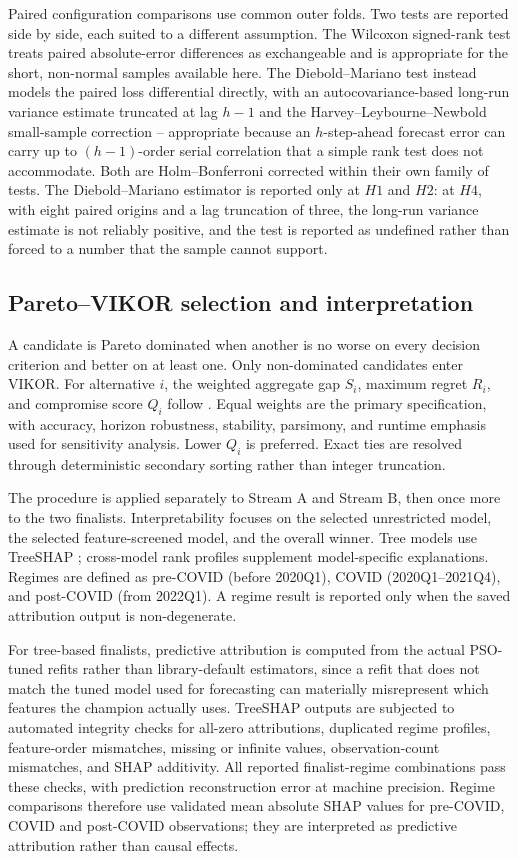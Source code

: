 \documentclass[preprint,12pt]{elsarticle}
\begin{document}
Paired configuration comparisons use common outer folds. Two tests are reported side by side, each suited to a different assumption. The Wilcoxon signed-rank test treats paired absolute-error differences as exchangeable and is appropriate for the short, non-normal samples available here. The Diebold--Mariano test \citep{dieboldmariano1995} instead models the paired loss differential directly, with an autocovariance-based long-run variance estimate truncated at lag $h-1$ and the Harvey--Leybourne--Newbold small-sample correction -- appropriate because an $h$-step-ahead forecast error can carry up to $(h-1)$-order serial correlation that a simple rank test does not accommodate. Both are Holm--Bonferroni corrected within their own family of tests. The Diebold--Mariano estimator is reported only at $H1$ and $H2$: at $H4$, with eight paired origins and a lag truncation of three, the long-run variance estimate is not reliably positive, and the test is reported as undefined rather than forced to a number that the sample cannot support.

\subsection{Pareto--VIKOR selection and interpretation}

A candidate is Pareto dominated when another is no worse on every decision criterion and better on at least one. Only non-dominated candidates enter VIKOR. For alternative $i$, the weighted aggregate gap $S_i$, maximum regret $R_i$, and compromise score $Q_i$ follow \citet{opricovic2004,opricovic2007}. Equal weights are the primary specification, with accuracy, horizon robustness, stability, parsimony, and runtime emphasis used for sensitivity analysis. Lower $Q_i$ is preferred. Exact ties are resolved through deterministic secondary sorting rather than integer truncation.

The procedure is applied separately to Stream A and Stream B, then once more to the two finalists. Interpretability focuses on the selected unrestricted model, the selected feature-screened model, and the overall winner. Tree models use TreeSHAP \citep{lundberg2017}; cross-model rank profiles supplement model-specific explanations. Regimes are defined as pre-COVID (before 2020Q1), COVID (2020Q1--2021Q4), and post-COVID (from 2022Q1). A regime result is reported only when the saved attribution output is non-degenerate.

For tree-based finalists, predictive attribution is computed from the actual PSO-tuned refits rather than library-default estimators, since a refit that does not match the tuned model used for forecasting can materially misrepresent which features the champion actually uses. TreeSHAP outputs are subjected to automated integrity checks for all-zero attributions, duplicated regime profiles, feature-order mismatches, missing or infinite values, observation-count mismatches, and SHAP additivity. All reported finalist-regime combinations pass these checks, with prediction reconstruction error at machine precision. Regime comparisons therefore use validated mean absolute SHAP values for pre-COVID, COVID and post-COVID observations; they are interpreted as predictive attribution rather than causal effects.
\end{document}
